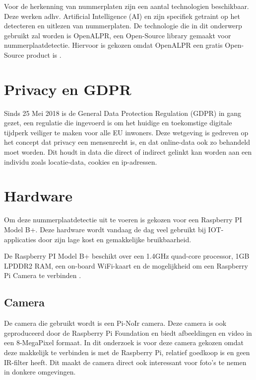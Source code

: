\par
Voor de herkenning van nummerplaten zijn een aantal technologien beschikbaar. Deze werken adhv. Artificial Intelligence (AI) en zijn specifiek getraint op het detecteren en uitlezen van nummerplaten.
De technologie die in dit onderwerp gebruikt zal worden is OpenALPR, een Open-Source library gemaakt voor nummerplaatdetectie. Hiervoor is gekozen omdat OpenALPR een gratis Open-Source product is \autocite{openalprgithub}.


\section{Privacy en GDPR}
\label{sec:privacy-en-gdpr}

Sinds 25 Mei 2018 is de General Data Protection Regulation (GDPR) in gang gezet, een regulatie die ingevoerd is om het huidige  en toekomstige digitale tijdperk veiliger te maken voor alle EU inwoners.
Deze wetgeving is gedreven op het concept dat privacy een mensenrecht is, en dat online-data ook zo behandeld moet worden. Dit houdt in data die direct of indirect gelinkt kan worden aan een individu zoals locatie-data, cookies en ip-adressen.\autocite{goddard2017eu}

\section{Hardware}
Om deze nummerplaatdetectie uit te voeren is gekozen voor een Raspberry PI Model B+. Deze hardware wordt vandaag de dag veel gebruikt bij IOT-applicaties door zijn lage kost en gemakkelijke bruikbaarheid.  

De Raspberry PI Model B+ beschikt over een 1.4GHz quad-core processor, 1GB LPDDR2 RAM, een on-board WiFi-kaart en de mogelijkheid om een Raspberry Pi Camera te verbinden \autocite{raspberrypisitemodelbplus} .

\subsection{Camera}
De camera die gebruikt wordt is een Pi-NoIr camera. Deze camera is ook geproduceerd door de Raspberry Pi Foundation en biedt afbeeldingen en video in een 8-MegaPixel formaat. In dit onderzoek is voor deze camera gekozen omdat deze makkelijk te verbinden is met de Raspberry Pi, relatief goedkoop is en geen IR-filter heeft. Dit maakt de camera direct ook interessant voor foto's te nemen in donkere omgevingen. \autocite{raspberrypisitemodelpinoir}